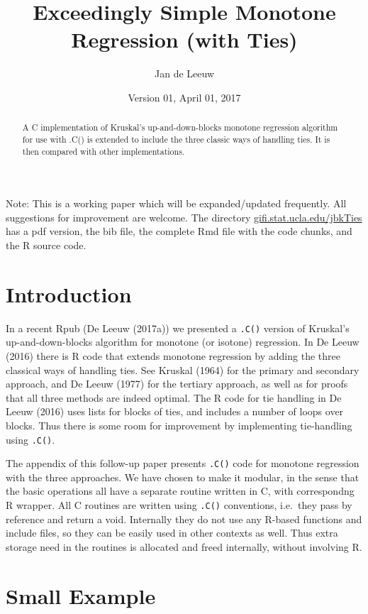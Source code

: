 \documentclass[12pt,]{article}
\title{Exceedingly Simple Monotone Regression (with Ties)}
\author{Jan de Leeuw}
\date{Version 01, April 01, 2017}
\begin{document}
\maketitle
\begin{abstract}
A C implementation of Kruskal's up-and-down-blocks monotone regression
algorithm for use with .C() is extended to include the three classic
ways of handling ties. It is then compared with other implementations.
\end{abstract}

{
\setcounter{tocdepth}{3}
\tableofcontents
}
Note: This is a working paper which will be expanded/updated frequently.
All suggestions for improvement are welcome. The directory
\href{http://gifi.stat.ucla.edu/jbkTies}{gifi.stat.ucla.edu/jbkTies} has
a pdf version, the bib file, the complete Rmd file with the code chunks,
and the R source code.

\section{Introduction}\label{introduction}

In a recent Rpub (De Leeuw (2017a)) we presented a \texttt{.C()} version
of Kruskal's up-and-down-blocks algorithm for monotone (or isotone)
regression. In De Leeuw (2016) there is R code that extends monotone
regression by adding the three classical ways of handling ties. See
Kruskal (1964) for the primary and secondary approach, and De Leeuw
(1977) for the tertiary approach, as well as for proofs that all three
methods are indeed optimal. The R code for tie handling in De Leeuw
(2016) uses lists for blocks of ties, and includes a number of loops
over blocks. Thus there is some room for improvement by implementing
tie-handling using \texttt{.C()}.

The appendix of this follow-up paper presents \texttt{.C()} code for
monotone regression with the three approaches. We have chosen to make it
modular, in the sense that the basic operations all have a separate
routine written in C, with correspondng R wrapper. All C routines are
written using \texttt{.C()} conventions, i.e.~they pass by reference and
return a void. Internally they do not use any R-based functions and
include files, so they can be easily used in other contexts as well.
Thus extra storage need in the routines is allocated and freed
internally, without involving R.

\section{Small Example}\label{small-example}
\end{document}
